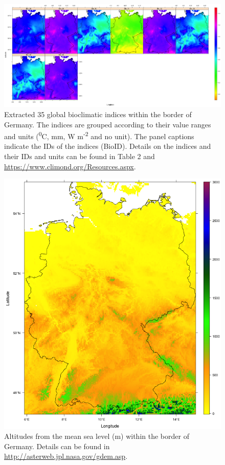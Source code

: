 \clearpage

\begin{figure}[h!]
  \centering
  \includegraphics[width=\textwidth]{Figures/Fig_C_2_b.png}
  \caption{Extracted 35 global bioclimatic indices within the border of Germany. The indices are grouped according to their value ranges and units (\textsuperscript{0}C, mm, W m\textsuperscript{-2} and no unit). The panel captions indicate the IDs of the indices (Bio\textunderscore ID). Details on the indices and their IDs and units can be found in Table 2 and \href{https://www.climond.org/Resources.aspx}{https://www.climond.org/Resources.aspx}.}
  \label{Fig_C_2_b}
\end{figure}

\newpage

\begin{figure}[h!]
  \centering
  \captionsetup{width=1.1\textwidth}
  \hspace{-2cm}\includegraphics[width=1.1\textwidth]{Figures/Fig_C_3.png}
  \caption{Altitudes from the mean sea level (m) within the border of Germany. Details can be found in \href{http://asterweb.jpl.nasa.gov/gdem.asp}{http://asterweb.jpl.nasa.gov/gdem.asp}.}
  \label{Fig_C_3}
\end{figure}


